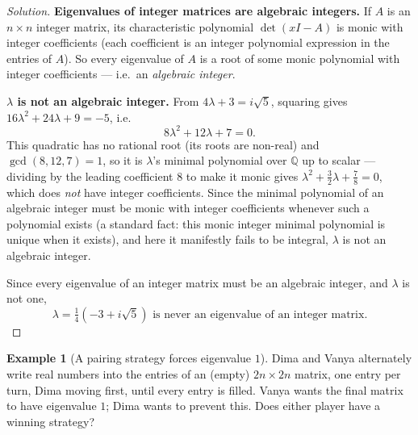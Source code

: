 \documentclass[11pt]{article}
\theoremstyle{definition}
\newtheorem{example}{Example}[section]
\begin{document}
\begin{proof}[Solution]
\textbf{Eigenvalues of integer matrices are algebraic integers.} If $A$ is an $n\times n$ integer matrix, its characteristic polynomial $\det(xI-A)$ is monic with integer coefficients (each coefficient is an integer polynomial expression in the entries of $A$). So every eigenvalue of $A$ is a root of some monic polynomial with integer coefficients — i.e.\ an \emph{algebraic integer}.

\textbf{$\lambda$ is not an algebraic integer.} From $4\lambda+3=i\sqrt5$, squaring gives $16\lambda^2+24\lambda+9=-5$, i.e.\
\[
8\lambda^2+12\lambda+7=0.
\]
This quadratic has no rational root (its roots are non-real) and $\gcd(8,12,7)=1$, so it is $\lambda$'s minimal polynomial over $\mathbb Q$ up to scalar — dividing by the leading coefficient $8$ to make it monic gives $\lambda^2+\tfrac32\lambda+\tfrac78=0$, which does \emph{not} have integer coefficients. Since the minimal polynomial of an algebraic integer must be monic with integer coefficients whenever such a polynomial exists (a standard fact: this monic integer minimal polynomial is unique when it exists), and here it manifestly fails to be integral, $\lambda$ is not an algebraic integer.

Since every eigenvalue of an integer matrix must be an algebraic integer, and $\lambda$ is not one,
\[
\boxed{\lambda=\tfrac14(-3+i\sqrt5) \text{ is never an eigenvalue of an integer matrix}}.
\]
\end{proof}

\begin{example}[A pairing strategy forces eigenvalue $1$]
Dima and Vanya alternately write real numbers into the entries of an (empty) $2n\times2n$ matrix, one entry per turn, Dima moving first, until every entry is filled. Vanya wants the final matrix to have eigenvalue $1$; Dima wants to prevent this. Does either player have a winning strategy?
\end{example}
\end{document}
